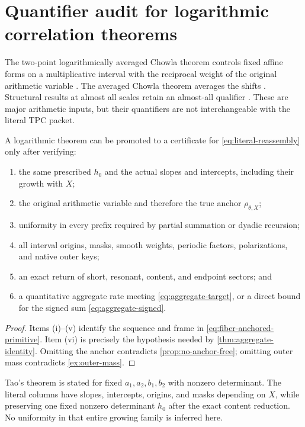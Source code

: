 \section{Quantifier audit for logarithmic correlation theorems}
\label{sec:literature}

The two-point logarithmically averaged Chowla theorem controls fixed
affine forms on a multiplicative interval with the reciprocal weight
of the original arithmetic variable \citep{Tao2016LogChowla}.  The
averaged Chowla theorem averages the shifts
\citep{MatomakiRadziwillTao2015}.  Structural results at almost all
scales retain an almost-all qualifier \citep{TaoTeravainen2019}.
These are major arithmetic inputs, but their quantifiers are not
interchangeable with the literal TPC packet.

\begin{proposition}
\label{prop:promotion-checklist}
A logarithmic theorem can be promoted to a certificate for
\eqref{eq:literal-reassembly} only after verifying:
\begin{enumerate}[label=\textup{(\roman*)},leftmargin=2.5em]
\item the same prescribed \(h_0\) and the actual slopes and
  intercepts, including their growth with \(X\);
\item the original arithmetic variable and therefore the true anchor
  \(\rho_{\theta,X}\);
\item uniformity in every prefix required by partial summation or
  dyadic recursion;
\item all interval origins, masks, smooth weights, periodic factors,
  polarizations, and native outer keys;
\item an exact return of short, resonant, content, and endpoint
  sectors; and
\item a quantitative aggregate rate meeting
  \eqref{eq:aggregate-target}, or a direct bound for the signed sum
  \eqref{eq:aggregate-signed}.
\end{enumerate}
\end{proposition}

\begin{proof}
Items (i)--(v) identify the sequence and frame in
\eqref{eq:fiber-anchored-primitive}.  Item (vi) is precisely the
hypothesis needed by \cref{thm:aggregate-identity}.  Omitting the
anchor contradicts \cref{prop:no-anchor-free}; omitting outer mass
contradicts \cref{ex:outer-mass}.
\end{proof}

\begin{remark}
Tao's theorem is stated for fixed \(a_1,a_2,b_1,b_2\) with nonzero
determinant.  The literal columns have slopes, intercepts, origins,
and masks depending on \(X\), while preserving one fixed nonzero
determinant \(h_0\) after the exact content reduction.  No uniformity
in that entire growing family is inferred here.
\end{remark}

